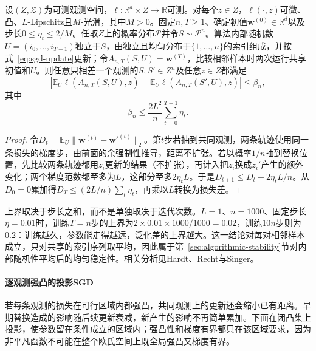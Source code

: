 \begin{theorem}[凸光滑SGD的稳定性]
\label{thm:convex-sgd-stability}
设$(Z,\mathcal Z)$为可测观测空间，$\ell:\mathbb R^d\times Z\to\mathbb R$可测。对每个$z\in Z$，$\ell(\cdot,z)$可微、凸、$L$-Lipschitz且$M$-光滑，其中$M>0$。固定$n,T\geq1$、确定初值$\bm w^{(0)}\in\mathbb R^d$以及步长$0\leq\eta_t\leq2/M$。任取$Z$上的概率分布$\mathcal P$并令$S\sim\mathcal P^n$。算法内部随机数$U=(i_0,\ldots,i_{T-1})$独立于$S$，由独立且均匀分布于$\{1,\ldots,n\}$的索引组成，并按式~\eqref{eq:sgd-update}更新；令$A_{n,T}(S,U)=\bm w^{(T)}$，比较相邻样本时两次运行共享初值和$U$。则任意只相差一个观测的$S,S'\in Z^n$及任意$z\in Z$都满足
\[
 \left|\mathbb E_U\ell(A_{n,T}(S,U),z)
 -\mathbb E_U\ell(A_{n,T}(S',U),z)\right|\leq\beta_n,
\]
其中
\[
 \beta_n\leq\frac{2L^2}{n}\sum_{t=0}^{T-1}\eta_t.
\]
\end{theorem}
\begin{proof}
令$D_t=\mathbb E_U\|\bm w^{(t)}-\bm w'^{(t)}\|_2$。第$t$步若抽到共同观测，两条轨迹使用同一条损失的梯度步，由前面的余强制性推导，距离不扩张。若以概率$1/n$抽到替换位置，先比较两条轨迹都用$z_i$更新的结果（不扩张），再计入把$z_i$换成$z_i'$产生的额外变化；两个梯度范数都至多为$L$，这部分至多$2\eta_tL$。于是$D_{t+1}\leq D_t+2\eta_tL/n$。从$D_0=0$累加得$D_T\leq(2L/n)\sum_t\eta_t$，再乘以$L$转换为损失差。
\end{proof}

上界取决于步长之和，而不是单独取决于迭代次数。$L=1$、$n=1000$、固定步长$\eta=0.01$时，训练$T=n$步的上界为$2\times0.01\times1000/1000=0.02$，训练$10n$步则为0.2：训练越久，参数能走得越远，泛化差的上界越大。这一结论对每对相邻样本成立，只对共享的索引序列取平均，因此属于第~\ref{sec:algorithmic-stability}节对内部随机性平均后的均匀稳定性。相关分析见Hardt、Recht与Singer。

\paragraph{逐观测强凸的投影SGD}

若每条观测的损失在可行区域内都强凸，共同观测上的更新还会缩小已有距离。早期替换造成的影响随后续更新衰减，新产生的影响不再简单累加。下面在闭凸集上投影，使参数留在条件成立的区域内；强凸性和梯度有界都只在该区域要求，因为非平凡函数不可能在整个欧氏空间上既全局强凸又梯度有界。

